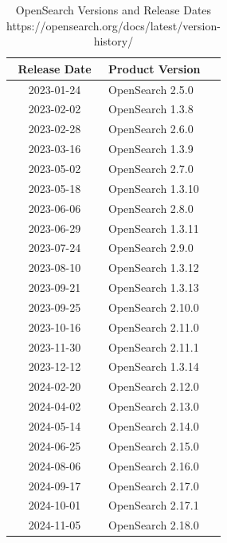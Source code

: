 \documentclass[../main.tex]{subfiles}
\begin{document}
\begin{table}[h]
\centering
\begin{tabular}{|c|l|}
\hline
\textbf{Release Date} & \textbf{Product Version} \\ \hline
    2023-01-24 & OpenSearch 2.5.0 \\ \hline  
    2023-02-02 & OpenSearch 1.3.8 \\ \hline  
    2023-02-28 & OpenSearch 2.6.0 \\ \hline  
    2023-03-16 & OpenSearch 1.3.9 \\ \hline  
    2023-05-02 & OpenSearch 2.7.0 \\ \hline  
    2023-05-18 & OpenSearch 1.3.10 \\ \hline  
    2023-06-06 & OpenSearch 2.8.0 \\ \hline  
    2023-06-29 & OpenSearch 1.3.11 \\ \hline  
    2023-07-24 & OpenSearch 2.9.0 \\ \hline  
    2023-08-10 & OpenSearch 1.3.12 \\ \hline  
    2023-09-21 & OpenSearch 1.3.13 \\ \hline  
    2023-09-25 & OpenSearch 2.10.0 \\ \hline  
    2023-10-16 & OpenSearch 2.11.0 \\ \hline  
    2023-11-30 & OpenSearch 2.11.1 \\ \hline  
    2023-12-12 & OpenSearch 1.3.14 \\ \hline  
    2024-02-20 & OpenSearch 2.12.0 \\ \hline  
    2024-04-02 & OpenSearch 2.13.0 \\ \hline  
    2024-05-14 & OpenSearch 2.14.0 \\ \hline  
    2024-06-25 & OpenSearch 2.15.0 \\ \hline  
    2024-08-06 & OpenSearch 2.16.0 \\ \hline  
    2024-09-17 & OpenSearch 2.17.0 \\ \hline  
    2024-10-01 & OpenSearch 2.17.1 \\ \hline  
    2024-11-05 & OpenSearch 2.18.0 \\ \hline
\end{tabular}
\caption{OpenSearch Versions and Release Dates https://opensearch.org/docs/latest/version-history/}
\label{table:opensearch_versions}
\end{table}
\end{document}
